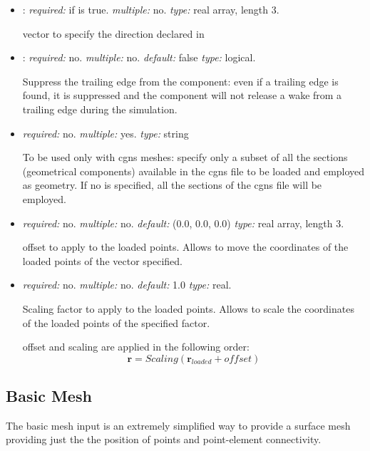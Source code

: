 \begin{itemize}
\item {}: \textit{required:} if  is true. \textit{multiple:} no. \textit{type:} real array, length 3.

vector to specify the direction declared in 

\item {}: \textit{required:} no. \textit{multiple:} no. \textit{default:} false \textit{type:} logical.

Suppress the trailing edge from the component: even if a trailing edge is found, it is suppressed and the component will not release a wake from a trailing edge during the simulation.

\item {} \textit{required:} no. \textit{multiple:} yes. \textit{type:} string 

To be used only with cgns meshes: specify only a subset of all the sections (geometrical components) available in the cgns file to be loaded and employed as geometry. If no  is specified, all the sections of the cgns file will be employed.

\item {} \textit{required:} no. \textit{multiple:} no. \textit{default:} (0.0, 0.0, 0.0) \textit{type:} real array, length 3.

offset to apply to the loaded points. Allows to move the coordinates of the loaded points of the vector specified. 

\item {} \textit{required:} no. \textit{multiple:} no. \textit{default:} 1.0 \textit{type:} real.

Scaling factor to apply to the loaded points. Allows to scale the coordinates of the loaded points of the specified factor.

offset and scaling are applied in the following order:
\begin{equation*}
\mathbf{r} = Scaling (\mathbf{r}_{loaded}+offset)
\end{equation*}
\end{itemize}

\subsection{Basic Mesh}
\label{subsec:Basic_Mesh}

The basic mesh input is an extremely simplified way to provide a surface mesh providing just the the position of points and point-element connectivity. 

